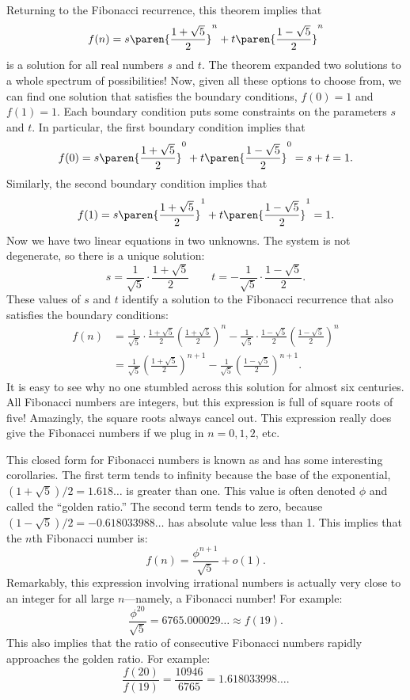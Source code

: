 Returning to the Fibonacci recurrence, this theorem implies that
\[
  f(n) = s \paren{\frac{1 + \sqrt{5}}{2}}^n + t \paren{\frac{1 - \sqrt{5}}{2}}^n
\]
is a solution for all real numbers $s$ and $t$.  The theorem expanded
two solutions to a whole spectrum of possibilities!  Now, given all
these options to choose from, we can find one solution that satisfies
the boundary conditions, $f(0) = 1$ and $f(1) = 1$.  Each boundary
condition puts some constraints on the parameters $s$ and $t$.  In
particular, the first boundary condition implies that
\[
f(0) = s \paren{\frac{1 + \sqrt{5}}{2}}^0 +
       t \paren{\frac{1 - \sqrt{5}}{2}}^0 = s + t = 1.
\]
Similarly, the second boundary condition implies that
\[
f(1) = s \paren{\frac{1 + \sqrt{5}}{2}}^1 + t \paren{\frac{1 - \sqrt{5}}{2}}^1 = 1.
\]
Now we have two linear equations in two unknowns.  The system is not
degenerate, so there is a unique solution:
\[
s = \frac{1}{\sqrt{5}} \cdot \frac{1 + \sqrt{5}}{2}\qquad
t = - \frac{1}{\sqrt{5}} \cdot \frac{1 - \sqrt{5}}{2}.
\]
These values of $s$ and $t$ identify a solution to the Fibonacci
recurrence that also satisfies the boundary conditions:
\begin{align*}
  f(n) & = \frac{1}{\sqrt{5}} \cdot \frac{1 + \sqrt{5}}{2} \left(\frac{1 + \sqrt{5}}{2}\right)^n-
  \frac{1}{\sqrt{5}} \cdot \frac{1 - \sqrt{5}}{2} \left(\frac{1 - \sqrt{5}}{2}\right)^n \\
  & = \frac{1}{\sqrt{5}} \left(\frac{1 + \sqrt{5}}{2}\right)^{n+1} -
  \frac{1}{\sqrt{5}} \left(\frac{1 - \sqrt{5}}{2}\right)^{n+1}.
\end{align*}
It is easy to see why no one stumbled across this solution for almost
six centuries.  All Fibonacci numbers are integers, but this expression
is full of square roots of five!  Amazingly, the square roots always
cancel out.  This expression really does give the Fibonacci numbers if
we plug in $n = 0, 1, 2$, etc.

This closed form for Fibonacci numbers is known as  and has some interesting corollaries.  The first term tends
to infinity because the base of the exponential, $(1+\sqrt{5})/2 =
1.618\dots$ is greater than one.  This value is often denoted $\phi$
and called the ``golden ratio.''  The second term tends to zero,
because $(1-\sqrt{5})/2 = -0.618033988\dots$ has absolute value less
than 1.  This implies that the $n$th Fibonacci number is:
\[
f(n) = \frac{\phi^{n+1}}{\sqrt{5}} + o(1).
\]
Remarkably, this expression involving irrational numbers is actually
very close to an integer for all large $n$---namely, a Fibonacci
number!  For example:
\[
\frac{\phi^{20}}{\sqrt{5}} = 6765.000029\dots \approx f(19).
\]
This also implies that the ratio of consecutive
Fibonacci numbers rapidly approaches the golden ratio.  For example:
\[
\frac{f(20)}{f(19)} = \frac{10946}{6765} = 1.618033998\dots.
\]

